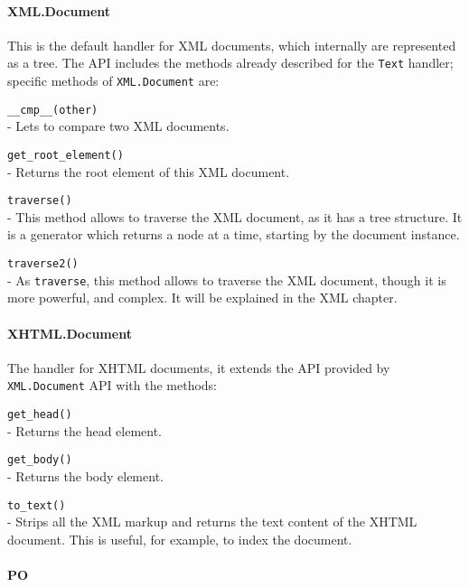 \paragraph{XML.Document}

This is the default handler for XML documents, which internally are
represented as a tree. The API includes the methods already described
for the {\tt Text} handler; specific methods of {\tt XML.Document} are:

\begin{api}
  {\tt \_\_cmp\_\_(other)}\\
  - Lets to compare two XML documents.

  {\tt get\_root\_element()}\\
  - Returns the root element of this XML document.

  {\tt traverse()}\\
  - This method allows to traverse the XML document, as it has a tree
    structure. It is a generator which returns a node at a time, starting
    by the document instance.

  {\tt traverse2()}\\
  - As {\tt traverse}, this method allows to traverse the XML document,
    though it is more powerful, and complex. It will be explained in the
    XML chapter.
\end{api}

\paragraph{XHTML.Document}

The handler for XHTML documents, it extends the API provided by
{\tt XML.Document} API with the methods:

\begin{api}
  {\tt get\_head()}\\
  - Returns the head element.

  {\tt get\_body()}\\
  - Returns the body element.

  {\tt to\_text()}\\
  - Strips all the XML markup and returns the text content of the XHTML
    document. This is useful, for example, to index the document.
\end{api}

\paragraph{PO}

